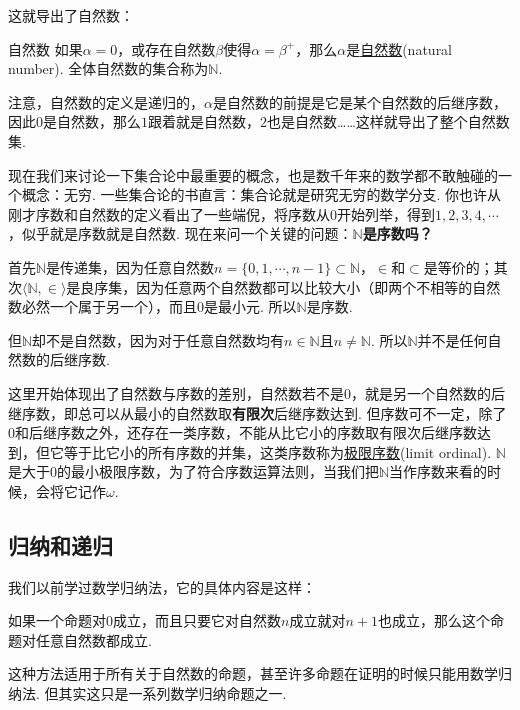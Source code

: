 \documentclass[main.tex]{subfiles}
\begin{document}
这就导出了自然数：
\begin{definition}{自然数}
    如果\(\alpha=0\)，或存在自然数\(\beta\)使得\(\alpha=\beta^+\)，那么\(\alpha\)是\uline{自然数}(natural number). 全体自然数的集合称为\(\mathbb{N}\).
\end{definition}
注意，自然数的定义是递归的，\(\alpha\)是自然数的前提是它是某个自然数的后继序数，因此\(0\)是自然数，那么\(1\)跟着就是自然数，\(2\)也是自然数……这样就导出了整个自然数集.

\vspace{1cm}
现在我们来讨论一下集合论中最重要的概念，也是数千年来的数学都不敢触碰的一个概念：无穷. 一些集合论的书直言：集合论就是研究无穷的数学分支. 你也许从刚才序数和自然数的定义看出了一些端倪，将序数从\(0\)开始列举，得到\(1,2,3,4,\cdots\)，似乎就是序数就是自然数. 现在来问一个关键的问题：\(\mathbb{N}\)\textbf{是序数吗？}

首先\(\mathbb{N}\)是传递集，因为任意自然数\(n=\{0,1,\cdots,n-1\} \subset \mathbb{N}\)，\(\in\)和\(\subset\)是等价的；其次\(\langle \mathbb{N},\in \rangle\)是良序集，因为任意两个自然数都可以比较大小（即两个不相等的自然数必然一个属于另一个），而且\(0\)是最小元. 所以\(\mathbb{N}\)是序数.

但\(\mathbb{N}\)却不是自然数，因为对于任意自然数均有\(n \in \mathbb{N}\)且\(n \neq \mathbb{N}\). 所以\(\mathbb{N}\)并不是任何自然数的后继序数. 

这里开始体现出了自然数与序数的差别，自然数若不是\(0\)，就是另一个自然数的后继序数，即总可以从最小的自然数取\textbf{有限次}后继序数达到. 但序数可不一定，除了\(0\)和后继序数之外，还存在一类序数，不能从比它小的序数取有限次后继序数达到，但它等于比它小的所有序数的并集，这类序数称为\uline{极限序数}(limit ordinal). \(\mathbb{N}\)是大于\(0\)的最小极限序数，为了符合序数运算法则，当我们把\(\mathbb{N}\)当作序数来看的时候，会将它记作\(\omega\).

\subsection{归纳和递归}

我们以前学过数学归纳法，它的具体内容是这样：
\begin{reference}
    如果一个命题对\(0\)成立，而且只要它对自然数\(n\)成立就对\(n+1\)也成立，那么这个命题对任意自然数都成立.
\end{reference}
这种方法适用于所有关于自然数的命题，甚至许多命题在证明的时候只能用数学归纳法. 但其实这只是一系列数学归纳命题之一.
\end{document}
